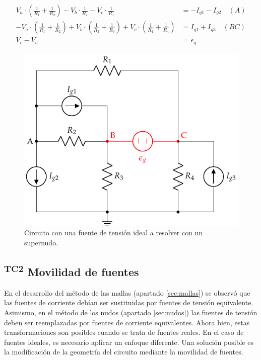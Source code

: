 \begin{align*}
  V_a\cdot (\frac{1}{R_1} + \frac{1}{R_2}) - V_b \cdot \frac{1}{R_2} - V_c \cdot \frac{1}{R_1} &= -I_{g1} - I_{g2} \quad (A)\\
  - V_a\cdot (\frac{1}{R_1} + \frac{1}{R_2}) + V_b \cdot (\frac{1}{R_2} + \frac{1}{R_3}) + V_c \cdot (\frac{1}{R_1} + \frac{1}{R_4}) &= I_{g1} + I_{g3} \quad (BC)\\
  V_c - V_b &= \epsilon_g
\end{align*}

\begin{figure}[H]
  \centering
  \includegraphics[height=0.25\textheight]{../figs/supernudo.pdf}
  \caption{Circuito con una fuente de tensión ideal a resolver con un
    supernudo.}
  \label{fig:supernudo}
\end{figure}

\subsection{\textsuperscript{TC2} Movilidad de fuentes}
\label{sec:movilidad-fuentes}

En el desarrollo del método de las mallas (apartado \ref{sec:mallas})
se observó que las fuentes de corriente debían ser sustituidas por
fuentes de tensión equivalente. Asimismo, en el método de los nudos
(apartado \ref{sec:nudos}) las fuentes de tensión deben ser
reemplazadas por fuentes de corriente equivalentes. Ahora bien, estas
transformaciones son posibles cuando se trata de fuentes reales. En el
caso de fuentes ideales, es necesario aplicar un enfoque
diferente. Una solución posible es la modificación de la geometría del
circuito mediante la movilidad de fuentes.

